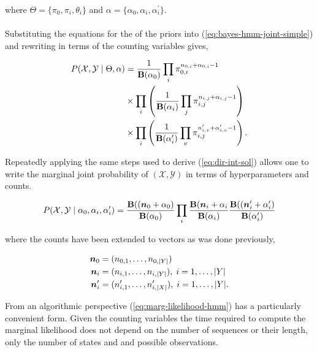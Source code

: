 \documentclass[12pt]{report}
\newcommand{\p}[0]{\prime}
\newcommand{\1}[0]{\mathbbm{1}}
\newcommand{\Bf}[0]{\text{\textbf{B}}}
\DeclarePairedDelimiter\abs{\lvert}{\rvert}%
\begin{document}
where $\Theta = \{\pi_0, \pi_i, \theta_i\}$ and $\alpha = \{\alpha_0, \alpha_i, \alpha_i^\prime\}$.
\\\\
Substituting the equations for the of the priors into (\ref{eq:bayes-hmm-joint-simple})
and rewriting in terms of the counting variables gives,

\begin{align} \label{eq:bayes-hmm-joint-full}
    P(\mathcal{X}, \mathcal{Y} \mid \Theta, \alpha)
    &= \frac{1}{\Bf(\alpha_0)} \prod_{i} \pi_{0,i}^{n_{0,i} + \alpha_{0,i} - 1} \nonumber \\
    & \times \prod_i \left(\frac{1}{\Bf(\alpha_i)} \prod_{j} \pi_{i,j}^{n_{i,j} + \alpha_{i,j} - 1}\right) \nonumber \\
    & \times \prod_i \left(\frac{1}{\Bf(\alpha_i^\prime)} \prod_{v} \pi_{i,j}^{n_{i,v}^\prime + \alpha_{i,v}^\prime - 1}\right).
\end{align}

Repeatedly applying the same steps used to derive (\ref{eq:dir-int-sol})
allows one to write the marginal joint probability of $(\mathcal{X}, \mathcal{Y})$
in terms of hyperparameters and counts.

\begin{equation}
    P(\mathcal{X}, \mathcal{Y} \mid \alpha_0, \alpha_i, \alpha_i^\prime)
    = \frac{\Bf((\bm{n}_0 + \alpha_0)}{\Bf(\alpha_0)}
    \prod_i \frac{\Bf{(\bm{n}_i + \alpha_i}}{\Bf(\alpha_i)}
    \frac{\Bf((\bm{n}_i^\p + \alpha_i^\p)}{\Bf(\alpha_i^\p)}
    \label{eq:marg-likelihood-hmm}
\end{equation}

where the counts have been extended to vectors as was done previously,

\begin{align*}
    \bm{n}_0 &= (n_{0,1}, \ldots, n_{0,\abs{Y}}) \\
    \bm{n}_i &= (n_{i,1}, \ldots, n_{i,\abs{Y}}),\; i = 1, \ldots, \abs{Y} \\
    \bm{n}_i^\p &= (n_{i,1}^\p, \ldots, n_{i,\abs{X}}^\p),\; i = 1, \ldots, \abs{Y}. \\
\end{align*}

From an algorithmic perspective (\ref{eq:marg-likelihood-hmm}) has a particularly convenient
form. Given the counting variables the time required to compute the marginal likelihood does not
depend on the number of sequences or their length, only the number of states and and possible observations.
\end{document}
